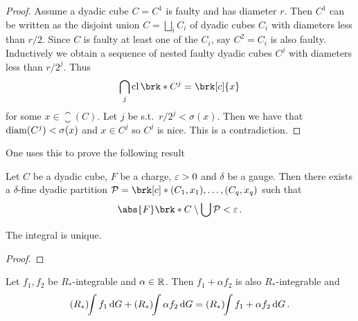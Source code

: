 \begin{frame}
	\begin{proof}
	Assume a dyadic cube $C=C^1$ is faulty and has diameter $r$. Then $C^1$ can be written as the disjoint union $C=\bigsqcup_iC_i$ of dyadic cubes $C_i$ with diameters less than $r/2$. Since $C$ is faulty at least one of the $C_i$, say $C^2=C_i$ is also faulty. Inductively we obtain a sequence of nested faulty dyadic cubes $C^j$ with diameters less than $r/2^j$. Thus
	\begin{align*}
		\bigcap_j\closure\brk*{C^j}=\brk[c]{x}
	\end{align*}
	for some $x\in \closure(C)$. Let $j$ be s.t.\ $r/2^j<\sigma(x)$. Then we have that $\operatorname{diam}(C^j)<\sigma(x)$ and $x\in C^j$ so $C^j$ is nice. This is a contradiction.
	\end{proof}
\end{frame}

\begin{frame}
	One uses this to prove the following result
	\begin{lemma}\label{le:DisjointCube}
	Let $C$ be a dyadic cube, $F$ be a charge, $\varepsilon>0$ and $\delta$ be a gauge. Then there exists a $\delta$-fine dyadic partition $\cP=\brk[c]*{(C_1,x_1),\dots,(C_q,x_q)}$ such that
	\begin{align*}
		\abs{F}\brk*{C\setminus\bigcup\cP}<\e\,.
	\end{align*}
	\end{lemma}
\end{frame}

\begin{frame}
	\begin{proposition}
	The integral is unique.
	\end{proposition}
	\begin{proof}
	\vspace*{0.5cm}
	\hspace*{1cm}
	\centering
	\scalebox{0.8}{
	\centering
	
	}
	\end{proof}
\end{frame}

\begin{frame}
	\begin{proposition}
	Let $f_1,f_2$ be $R_*$-integrable and $\alpha\in\mathbb{R}$. Then $f_1+\alpha f_2$ is also $R_*$-integrable and
	\begin{align*}
		(R_*)\!\!\int f_1\,\mathrm{d} G + (R_*)\!\!\int \alpha f_2\,\mathrm{d} G=(R_*)\!\!\int f_1+\alpha f_2\,\mathrm{d} G\,.
	\end{align*}
	\end{proposition}
\end{frame}

